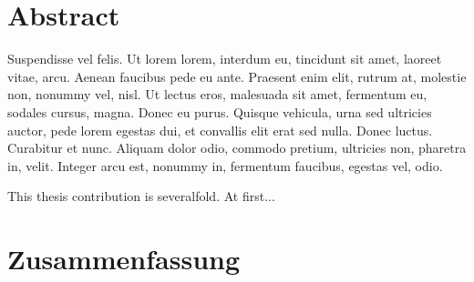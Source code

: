 \chapter*{Abstract}\label{sec:abstract}


Suspendisse vel felis. Ut lorem lorem, interdum eu, tincidunt sit amet, laoreet vitae, arcu. Aenean faucibus pede eu ante. Praesent enim elit, rutrum at, molestie non, nonummy vel, nisl. Ut lectus eros, malesuada sit amet, fermentum eu, sodales cursus, magna. Donec eu purus. Quisque vehicula, urna sed ultricies auctor, pede lorem egestas dui, et convallis elit erat sed nulla. Donec luctus. Curabitur et nunc. Aliquam dolor odio, commodo pretium, ultricies non, pharetra in, velit. Integer arcu est, nonummy in, fermentum faucibus, egestas vel, odio.

\lipsum[6]

This thesis contribution is severalfold. At first...
\lipsum[6]

\lipsum[6]

%

\cleardoublepage
\chapter*{Zusammenfassung}\label{sec:zusammenfassung}
\lipsum[6]

\lipsum[6]

\lipsum[6]

\lipsum[6]
\cleardoublepage
